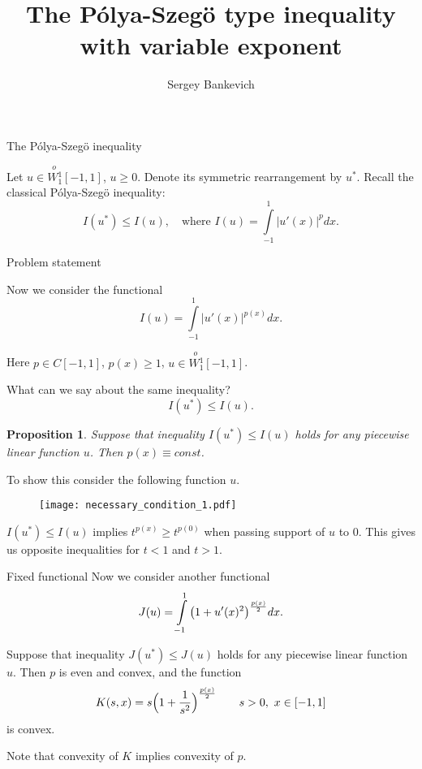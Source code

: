 \documentclass{beamer}\usepackage[]{graphicx}\usepackage[]{color}
\title{The P\'olya-Szeg\"o type inequality with variable exponent}
\author{Sergey Bankevich}
\institute{Saint Petersburg State University, Russia\\
\bigskip
Suzdal}
\date {
}
\renewcommand{\ge}{\geqslant}
\renewcommand{\le}{\leqslant}
\newcommand{\Wf}{\stackrel{o\ }{W{}_1^1}}
\newtheorem{prop}{Proposition}
\begin{document}
\begin{frame}
  \titlepage
\end{frame}

\begin{frame}{The P\'olya-Szeg\"o inequality}

Let $u \in \Wf[-1, 1]$, $u \ge 0$.
Denote its symmetric rearrangement by $u^*$.
Recall the classical P\'olya-Szeg\"o inequality:
$$I(u^*) \le I(u), \quad \mbox{where } I(u) = \int\limits_{-1}^1 |u'(x)|^p dx.$$

\end{frame}


\begin{frame}{Problem statement}

Now we consider the functional
{\Large 
\begin{equation}
I(u) = \int\limits_{-1}^1 |u'(x)|^{p(x)} dx.
\label{sfunc}
\end{equation}
}

Here $p \in C[-1, 1]$, $p(x) \ge 1$, $u \in \Wf[-1, 1]$.

\pause

\bigskip
What can we say about the same inequality?
{\Large 
\begin{equation}
I(u^*) \le I(u).
\label{ineq}
\end{equation}
}

\end{frame}


\begin{frame}{}

\begin{prop}
Suppose that inequality $I(u^*) \le I(u)$ holds for any piecewise linear function $u$.
Then $p(x) \equiv const$.
\end{prop}

To show this consider the following function $u$.
\begin{figure}
	\texttt{[image: necessary\_condition\_1.pdf]}
\end{figure}
$I(u^*) \le I(u)$ implies $t^{p(x)} \ge t^{p(0)}$ when passing support of $u$ to $0$.
This gives us opposite inequalities for $t < 1$ and $t > 1$.


\end{frame}


\begin{frame}{Fixed functional}
Now we consider another functional
{\large
\begin{equation}
J(u) = \int\limits_{-1}^1 \big(1 + u'(x)^2 \big)^{p(x) \over 2} dx.
\label{func}
\end{equation}
}

\begin{theorem}
Suppose that inequality $J(u^*) \le J(u)$ holds for any piecewise linear function $u$.
Then $p$ is even and convex,
and the function
$$K(s, x) = s \Big( 1 + { 1 \over s^2 } \Big)^{p(x) \over 2} \qquad s > 0,\ x \in [-1, 1]$$
is convex.
\end{theorem}

Note that convexity of $K$ implies convexity of $p$.

\end{frame}
\end{document}
